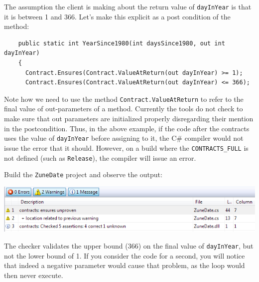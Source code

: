 \documentclass{article}
\newcommand{\code}[1]{\lstinline{#1}}
\begin{document}
The assumption the client is making about the return value of
\code{dayInYear} is that it is between 1 and 366. Let's make this
explicit as a post condition of the method:
\begin{lstlisting}
    public static int YearSince1980(int daysSince1980, out int dayInYear)
    {
      Contract.Ensures(Contract.ValueAtReturn(out dayInYear) >= 1);
      Contract.Ensures(Contract.ValueAtReturn(out dayInYear) <= 366);
\end{lstlisting}
Note how we need to use the method \code{Contract.ValueAtReturn} to
refer to the final value of out-parameters of a method.
Currently the tools do not check to make sure that out
parameters are initialized properly disregarding their mention in the
postcondition. Thus, in the above example, if the code after the
contracts uses the value of \code{dayInYear} before assigning to it, the C\#
compiler would not issue the error that it should. However, on a build
where the \code{CONTRACTS_FULL} is not defined (such as
\code{Release}), the compiler will issue an error.

Build the
\code{ZuneDate} project and observe the output:
\begin{center}
  \includegraphics[width=1\columnwidth]{errors6.png}
\end{center}
The checker validates the upper bound (366) on the final value of
\code{dayInYear}, but not the lower bound of 1. If you consider the
code for a second, you will notice that indeed a negative parameter
would cause that problem, as the loop would then never execute.
\end{document}
